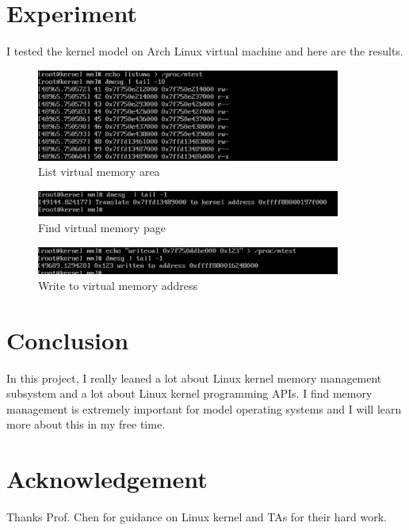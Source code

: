 \documentclass{article}
\begin{document}
\section{Experiment}
I tested the kernel model on Arch Linux virtual machine and here are the results.
\begin{figure}[H]
\centering
\includegraphics[width=10cm]{listvma.png}
\caption{List virtual memory area}
\end{figure}
\begin{figure}[H]
\centering
\includegraphics[width=10cm]{findpage.png}
\caption{Find virtual memory page}
\end{figure}
\begin{figure}[H]
\centering
\includegraphics[width=10cm]{writeval.png}
\caption{Write to virtual memory address}
\end{figure}

\section{Conclusion}
In this project, I really leaned a lot about Linux kernel memory management subsystem and a lot about Linux kernel programming APIs. I find memory management is extremely important for model operating systems and I will learn more about this in my free time.




\section*{Acknowledgement}
Thanks Prof. Chen for guidance on Linux kernel and TAs for their hard work.
\end{document}
